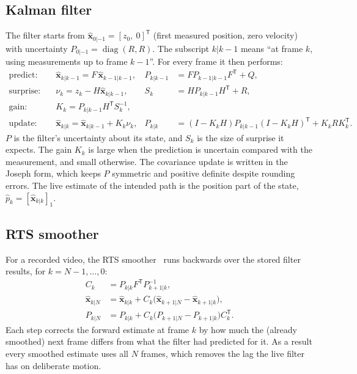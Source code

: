 \documentclass[11pt,a4paper]{article}
\newcommand{\T}{^{\mathsf T}}
\begin{document}
\subsection{Kalman filter}\label{sec:kf}
The filter starts from $\hat{\mathbf{x}}_{0|-1} = [z_0,\ 0]\T$ (first measured position, zero
velocity) with uncertainty $P_{0|-1} = \operatorname{diag}(R, R)$. The subscript $k|k-1$ means
``at frame $k$, using measurements up to frame $k-1$''. For every frame it then performs:
\begin{align}
  \text{predict:}\quad & \hat{\mathbf{x}}_{k|k-1} = F\,\hat{\mathbf{x}}_{k-1|k-1}, &
  P_{k|k-1} &= F P_{k-1|k-1} F\T + Q, \\
  \text{surprise:}\quad & \nu_k = z_k - H\hat{\mathbf{x}}_{k|k-1}, &
  S_k &= H P_{k|k-1} H\T + R, \\
  \text{gain:}\quad & K_k = P_{k|k-1} H\T S_k^{-1}, && \\
  \text{update:}\quad & \hat{\mathbf{x}}_{k|k} = \hat{\mathbf{x}}_{k|k-1} + K_k \nu_k, &
  P_{k|k} &= (I - K_k H) P_{k|k-1} (I - K_k H)\T + K_k R K_k\T .
\end{align}
$P$ is the filter's uncertainty about its state, and $S_k$ is the size of surprise it expects.
The gain $K_k$ is large when the prediction is uncertain compared with the measurement, and
small otherwise. The covariance update is written in the Joseph form, which keeps $P$
symmetric and positive definite despite rounding errors. The live estimate of the intended
path is the position part of the state, $\hat p_k = [\hat{\mathbf{x}}_{k|k}]_1$.

\subsection{RTS smoother}\label{sec:rts}
For a recorded video, the RTS smoother~\cite{rts1965} runs backwards over the stored filter
results, for $k = N-1, \dots, 0$:
\begin{align}
  C_k &= P_{k|k} F\T P_{k+1|k}^{-1}, \\
  \hat{\mathbf{x}}_{k|N} &= \hat{\mathbf{x}}_{k|k} + C_k \bigl(\hat{\mathbf{x}}_{k+1|N} - \hat{\mathbf{x}}_{k+1|k}\bigr), \\
  P_{k|N} &= P_{k|k} + C_k \bigl(P_{k+1|N} - P_{k+1|k}\bigr) C_k\T .
\end{align}
Each step corrects the forward estimate at frame $k$ by how much the (already smoothed) next
frame differs from what the filter had predicted for it. As a result every smoothed estimate
uses all $N$ frames, which removes the lag the live filter has on deliberate motion.
\end{document}
